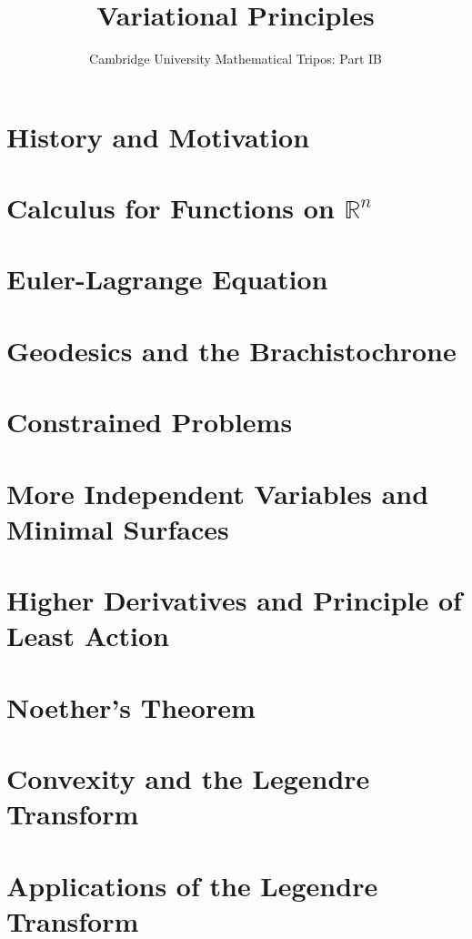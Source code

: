 \documentclass{article}
\title{Variational Principles}
\author{Cambridge University Mathematical Tripos: Part IB}
\begin{document}
\maketitle

\tableofcontentsnewpage{}

\section{History and Motivation}

\section{Calculus for Functions on \(\mathbb R^n\)}

\section{Euler-Lagrange Equation}

\section{Geodesics and the Brachistochrone}

\section{Constrained Problems}

\section{More Independent Variables and Minimal Surfaces}

\section{Higher Derivatives and Principle of Least Action}

\section{Noether's Theorem}

\section{Convexity and the Legendre Transform}

\section{Applications of the Legendre Transform}

\end{document}
